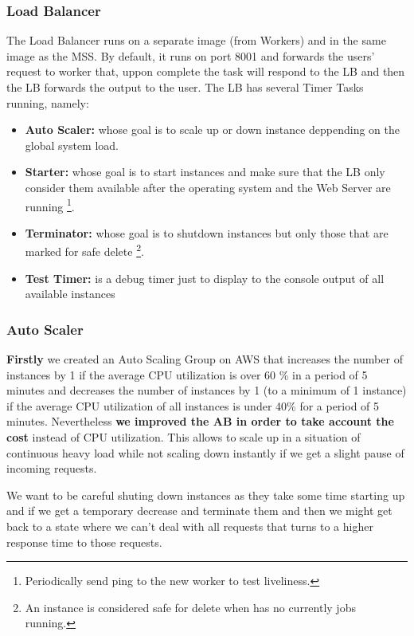 \documentclass[times, 10pt,twocolumn]{article}
\begin{document}
\subsubsection{Load Balancer}
   The Load Balancer runs on a separate image (from Workers) and in the same image as the MSS.
   By default, it runs on port 8001 and forwards the users' request to worker that, uppon complete the task
   will respond to the LB and then the LB forwards the output to the user.
   The LB has several Timer Tasks running, namely:
   \begin{itemize}
      \item \textbf{Auto Scaler:} whose goal is to scale up or down instance deppending on the global system load.
      \item \textbf{Starter:} whose goal is to start instances and make sure that the LB only consider them available
                              after the operating system and the Web Server are running 
                              \footnote{Periodically send ping to the new worker to test liveliness.}.
      \item \textbf{Terminator:} whose goal is to shutdown instances but only those that are marked for safe delete 
                                 \footnote{An instance is considered safe for delete when has no currently jobs running.}.
      \item \textbf{Test Timer:} is a debug timer just to display to the console output of all available instances 
   \end{itemize}

   

\subsubsection{Auto Scaler}
   \textbf{Firstly} we created an Auto Scaling Group on AWS that increases the number of instances by
   1 if the average CPU utilization is over 60 \% in a period of 5 minutes and
   decreases the number of instances by 1 (to a minimum of 1 instance) if the average CPU 
   utilization of all instances is under 40\% for a period of 5 minutes. Nevertheless 
   \textbf{we improved the AB in order to take account the cost} instead of CPU utilization.
   This allows to scale up in a situation of continuous heavy load while not scaling down instantly
   if we get a slight pause of incoming requests. 

   We want to be careful shuting down instances as they take some time starting up and if 
   we get a temporary decrease and terminate them and then we might get back to a state
   where we can't deal with all requests that turns to a higher response time to those 
   requests. 
\end{document}

